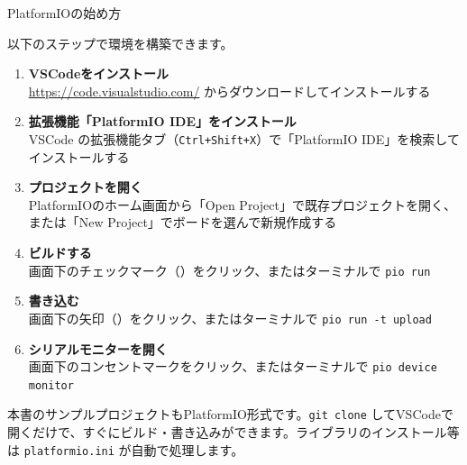 \begin{qabox}{PlatformIOの始め方}

以下のステップで環境を構築できます。

\begin{enumerate}
  \item \textbf{VSCodeをインストール} \\
        \url{https://code.visualstudio.com/} からダウンロードしてインストールする

  \item \textbf{拡張機能「PlatformIO IDE」をインストール} \\
        VSCode の拡張機能タブ（\texttt{Ctrl+Shift+X}）で「PlatformIO IDE」を検索してインストールする

  \item \textbf{プロジェクトを開く} \\
        PlatformIOのホーム画面から「Open Project」で既存プロジェクトを開く、\\
        または「New Project」でボードを選んで新規作成する

  \item \textbf{ビルドする} \\
        画面下のチェックマーク（\checkmark）をクリック、またはターミナルで \texttt{pio run}

  \item \textbf{書き込む} \\
        画面下の矢印（\textrightarrow）をクリック、またはターミナルで \texttt{pio run -t upload}

  \item \textbf{シリアルモニターを開く} \\
        画面下のコンセントマークをクリック、またはターミナルで \texttt{pio device monitor}
\end{enumerate}

\begin{notebox}[本書のサンプルプロジェクトについて]
本書のサンプルプロジェクトもPlatformIO形式です。\texttt{git clone} してVSCodeで開くだけで、すぐにビルド・書き込みができます。ライブラリのインストール等は \texttt{platformio.ini} が自動で処理します。
\end{notebox}

\end{qabox}
